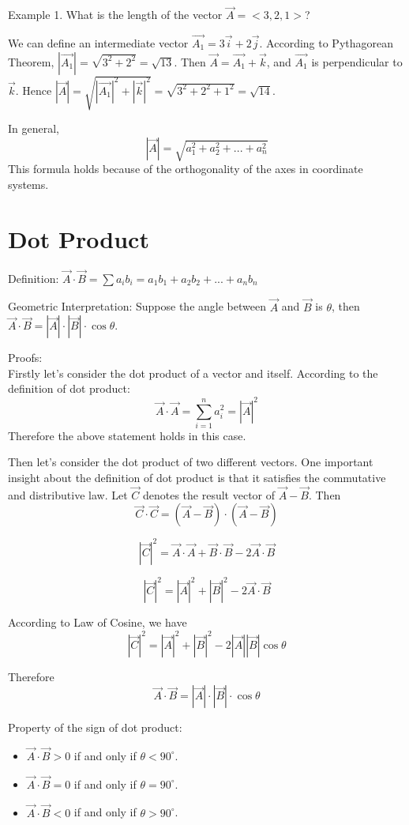 \documentclass{article}
\begin{document}
Example 1. What is the length of the vector $\vec{A} = <3, 2, 1>$?

We can define an intermediate vector $\vec{A_{1}} = 3\vec{i} + 2\vec{j}$.
According to Pythagorean Theorem, $|\vec{A_{1}}| = \sqrt{3^2 + 2^2} = \sqrt{13}$.
Then $\vec{A} = \vec{A_{1}} + \vec{k}$, and $\vec{A_{1}}$ is perpendicular to
$\vec{k}$. Hence $|\vec{A}| = \sqrt{|\vec{A_{1}}|^2 + |\vec{k}|^2} =
\sqrt{3^2 + 2^2 + 1^2} = \sqrt{14}$.

In general,
\[ |\vec{A}| = \sqrt{a_{1}^{2} + a_{2}^{2} + ... + a_{n}^{2}} \]
This formula holds because of the orthogonality of the axes in coordinate
systems.

\section{Dot Product}

Definition: $\vec{A} \cdot \vec{B} = \sum a_{i}b_{i} = a_{1}b_{1} + a_{2}b_{2} +
... + a_{n}b_{n}$

Geometric Interpretation: Suppose the angle between $\vec{A}$ and $\vec{B}$ is
$\theta$, then $\vec{A} \cdot \vec{B} = |\vec{A}| \cdot |\vec{B}| \cdot \cos\theta$.

Proofs:\\
Firstly let's consider the dot product of a vector and itself. According to the
definition of dot product:
\[ \vec{A} \cdot \vec{A} = \sum_{i=1}^{n}a_{i}^2 = |\vec{A}|^2 \]
Therefore the above statement holds in this case.

Then let's consider the dot product of two different vectors. One important
insight about the definition of dot product is that it satisfies the commutative
and distributive law. Let $\vec{C}$ denotes the result vector of
$\vec{A} - \vec{B}$. Then
\[ \vec{C} \cdot \vec{C} = (\vec{A} - \vec{B}) \cdot (\vec{A} - \vec{B}) \]

\[ |\vec{C}|^2 = \vec{A} \cdot \vec{A} + \vec{B} \cdot \vec{B} - 2 \vec{A} \cdot \vec{B} \]

\[ |\vec{C}|^2 = |\vec{A}|^2 + |\vec{B}|^2 - 2 \vec{A} \cdot \vec{B} \]

According to Law of Cosine, we have
\[ |\vec{C}|^2 = |\vec{A}|^2 + |\vec{B}|^2 - 2|\vec{A}||\vec{B}|\cos\theta \]

Therefore
\[ \vec{A} \cdot \vec{B} = |\vec{A}| \cdot |\vec{B}| \cdot \cos\theta \]

\bigskip

Property of the sign of dot product:
\begin{itemize}
    \item $\vec{A} \cdot \vec{B} > 0$ if and only if $\theta < 90^{\circ}$.
    \item $\vec{A} \cdot \vec{B} = 0$ if and only if $\theta = 90^{\circ}$.
    \item $\vec{A} \cdot \vec{B} < 0$ if and only if $\theta > 90^{\circ}$.
\end{itemize}
\end{document}
